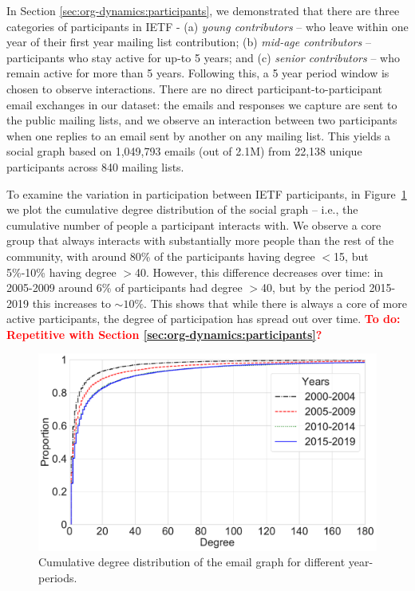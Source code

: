 \documentclass[twocolumn,10pt]{article}
\newlength{\figureWidthOneColumn}
\newcommand{\todo}[1]{\textbf{\textcolor{red}{To do: #1}}}
\newcommand{\pb}[1]{\vspace{0.75ex}\noindent{\textbf{#1}}}
\begin{document}
In Section \ref{sec:org-dynamics:participants}, we demonstrated that there
are three categories of participants in IETF - (a) \textit{young
contributors} -- who leave within one year of their first year mailing list
contribution; (b) \textit{mid-age contributors} -- participants who stay
active for up-to 5 years; and (c) \textit{senior contributors} -- who
remain active for more than 5 years. Following this, a 5 year period window
is chosen to observe interactions. There are no direct
participant-to-participant email exchanges in our dataset: the emails and
responses we capture are sent to the public mailing lists, and we observe
an interaction between two participants when one replies to an email sent
by another on any mailing list. This yields a social graph based on
1,049,793 emails (out of 2.1M) from 22,138 unique participants across 840
mailing lists.

\pb{Participation}
To examine the variation in participation between IETF participants, in
Figure~\ref{fig:degree_cdf} we plot the cumulative degree distribution of
the social graph -- i.e., the cumulative number of people a participant
interacts with.  We observe a core group that always interacts with
substantially more people than the rest of the community, with around 80\%
of the participants having degree  $<$15, but 5\%-10\% having degree $>$40.
However,  this difference decreases over time: in 2005-2009 around 6\% of
participants had degree $>$40, but by the period 2015-2019 this increases
to $\sim10\%$.  This shows that while there is always a core of more active
participants, the degree of participation has spread  out over time.
\todo{Repetitive with Section \ref{sec:org-dynamics:participants}?}

\begin{figure}
  \centering
  \includegraphics[width=\figureWidthOneColumn]{figures-prev/icwsm-2022/degree_CDF.pdf}
  \caption{
    Cumulative degree distribution of the email graph for different
    year-periods.
  }
  \label{fig:degree_cdf}
\end{figure}
\end{document}
